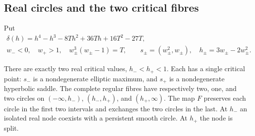 \subsection{Real circles and the two critical fibres}

Put
\begin{equation}
\begin{gathered}
 \delta(h)=h^4-h^3-8Th^2+36Th+16T^2-27T,\\
 w_-<0,\quad w_+>1,\quad w_\pm^3(w_\pm-1)=T,\qquad
 s_\pm=(w_\pm^2,w_\pm),\quad h_\pm=3w_\pm-2w_\pm^2.
\end{gathered}
\label{eq:critical}
\end{equation}
\begin{proposition}\label{prop:real-geometry}
There are exactly two real critical values, $h_-<h_+<1$.
Each has a single critical point: $s_-$ is a nondegenerate elliptic
maximum, and $s_+$ is a nondegenerate hyperbolic saddle.
The complete regular fibres have respectively two, one, and two
circles on $(-\infty,h_-)$, $(h_-,h_+)$, and $(h_+,\infty)$.
The map $F$ preserves each circle in the first two intervals and
exchanges the two circles in the last. At $h_-$ an isolated real node
coexists with a persistent smooth circle. At $h_+$ the node is split.
\end{proposition}
